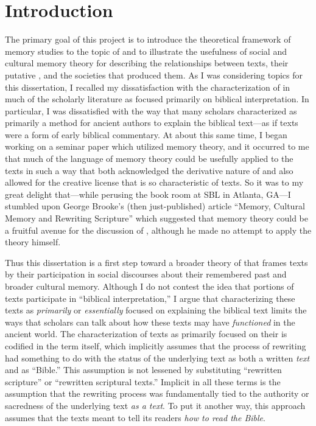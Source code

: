 
\chapter*{Introduction}


The primary goal of this project is to introduce the theoretical framework of memory studies to the topic of \rwb and to illustrate the usefulness of social and cultural memory theory for describing the relationships between \rwb texts, their putative \vorlagen, and the societies that produced them. As I was considering topics for this dissertation, I recalled my dissatisfaction with the characterization of \rwb in much of the scholarly literature as focused primarily on biblical interpretation. In particular, I was dissatisfied with the way that many scholars characterized \rwb as primarily a method for ancient authors to explain the biblical text---as if \rwb texts were a form of early biblical commentary. At about this same time, I began working on a seminar paper which utilized memory theory, and it occurred to me that much of the language of memory theory could be usefully applied to the \rwb texts in such a way that both acknowledged the derivative nature of \rwb and also allowed for the creative license that is so characteristic of \rwb texts. So it was to my great delight that---while perusing the book room at SBL in Atlanta, GA---I stumbled upon George Brooke's (then just-published) article ``Memory, Cultural Memory and Rewriting Scripture'' which suggested that memory theory could be a fruitful avenue for the discussion of \rwb, although he made no attempt to apply the theory himself.%
    \autocite{brooke_zsengeller2014}

Thus this dissertation is a first step toward a broader theory of \rwb that frames \rwb texts by their participation in social discourses about their remembered past and broader cultural memory. Although I do not contest the idea that portions of \rwb texts participate in ``biblical interpretation,'' I argue that characterizing these texts as \emph{primarily} or \emph{essentially} focused on explaining the biblical text limits the ways that scholars can talk about how these texts may have \emph{functioned} in the ancient world. The characterization of \rwb texts as primarily focused on their \vorlagen is codified in the term \rwb itself, which implicitly assumes that the process of rewriting had something to do with the status of the underlying text as both a written \emph{text} and as ``Bible.'' This assumption is not lessened by substituting ``rewritten scripture'' or ``rewritten scriptural texts.'' Implicit in all these terms is the assumption that the rewriting process was fundamentally tied to the authority or sacredness of the underlying text \emph{as a text}. To put it another way, this approach assumes that the \rwb texts meant to tell its readers \emph{how to read the Bible}.

